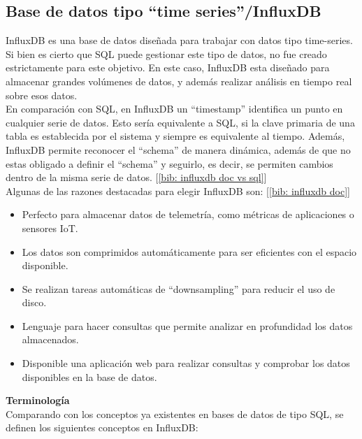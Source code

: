 \documentclass[a4paper, oneside, 12pt]{book}
\begin{document}
	
	
	\pagebreak
	
	\subsection{Base de datos tipo ``time series''/InfluxDB} 
	
	\noindent InfluxDB es una base de datos diseñada para trabajar con datos tipo time-series. Si bien es cierto que SQL puede gestionar este tipo de datos, no fue creado estrictamente para este objetivo. En este caso, InfluxDB esta diseñado para almacenar grandes volúmenes de datos, y además realizar análisis en tiempo real sobre esos datos. \\
	
	\noindent En comparación con SQL, en InfluxDB un ``timestamp'' identifica un punto en cualquier serie de datos. Esto sería equivalente a SQL, si la clave primaria de una tabla es establecida por el sistema y siempre es equivalente al tiempo. Además, InfluxDB permite reconocer el ``schema'' de manera dinámica, además de que no estas obligado a definir el ``schema'' y seguirlo, es decir, se permiten cambios dentro de la misma serie de datos. [\ref{bib: influxdb doc vs sql}] \\
	
	\noindent Algunas de las razones destacadas para elegir InfluxDB son: [\ref{bib: influxdb doc}]
	
	\begin{itemize}
		\item Perfecto para almacenar datos de telemetría, como métricas de aplicaciones o sensores IoT.
		\item Los datos son comprimidos automáticamente para ser eficientes con el espacio disponible.
		\item Se realizan tareas automáticas de ``downsampling'' para reducir el uso de disco.
		\item Lenguaje para hacer consultas que permite analizar en profundidad los datos almacenados.
		\item Disponible una aplicación web para realizar consultas y comprobar los datos disponibles en la base de datos.
	\end{itemize}

	\vspace{10px}

	\noindent \textbf{\large Terminología} \\
	
	\noindent Comparando con los conceptos ya existentes en bases de datos de tipo SQL, se definen los siguientes conceptos en InfluxDB:
	
\end{document}
